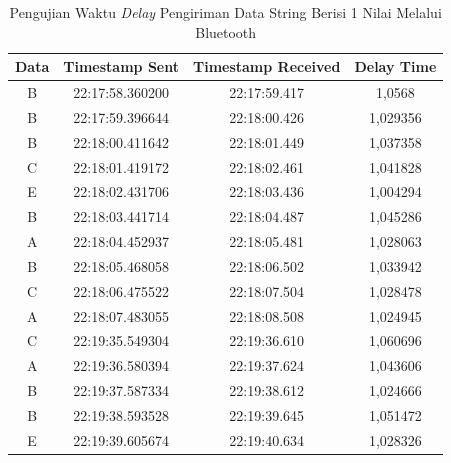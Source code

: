 \begin{longtable}{|ccc|c|}
  \caption{Pengujian Waktu \emph{Delay} Pengiriman Data String Berisi 1 Nilai Melalui Bluetooth}
  \label{tbl:delayBluetooth1}\\
  \hline
  \multicolumn{1}{|c|}{Data} & \multicolumn{1}{c|}{Timestamp Sent}  & Timestamp Received & Delay Time  \\ \hline
  \endfirsthead
  \endhead
  \multicolumn{1}{|c|}{B}    & \multicolumn{1}{c|}{22:17:58.360200} & 22:17:59.417       & 1,0568      \\ \hline
  \multicolumn{1}{|c|}{B}    & \multicolumn{1}{c|}{22:17:59.396644} & 22:18:00.426       & 1,029356    \\ \hline
  \multicolumn{1}{|c|}{B}    & \multicolumn{1}{c|}{22:18:00.411642} & 22:18:01.449       & 1,037358    \\ \hline
  \multicolumn{1}{|c|}{C}    & \multicolumn{1}{c|}{22:18:01.419172} & 22:18:02.461       & 1,041828    \\ \hline
  \multicolumn{1}{|c|}{E}    & \multicolumn{1}{c|}{22:18:02.431706} & 22:18:03.436       & 1,004294    \\ \hline
  \multicolumn{1}{|c|}{B}    & \multicolumn{1}{c|}{22:18:03.441714} & 22:18:04.487       & 1,045286    \\ \hline
  \multicolumn{1}{|c|}{A}    & \multicolumn{1}{c|}{22:18:04.452937} & 22:18:05.481       & 1,028063    \\ \hline
  \multicolumn{1}{|c|}{B}    & \multicolumn{1}{c|}{22:18:05.468058} & 22:18:06.502       & 1,033942    \\ \hline
  \multicolumn{1}{|c|}{C}    & \multicolumn{1}{c|}{22:18:06.475522} & 22:18:07.504       & 1,028478    \\ \hline
  \multicolumn{1}{|c|}{A}    & \multicolumn{1}{c|}{22:18:07.483055} & 22:18:08.508       & 1,024945    \\ \hline
  \multicolumn{1}{|c|}{C}    & \multicolumn{1}{c|}{22:19:35.549304} & 22:19:36.610       & 1,060696    \\ \hline
  \multicolumn{1}{|c|}{A}    & \multicolumn{1}{c|}{22:19:36.580394} & 22:19:37.624       & 1,043606    \\ \hline
  \multicolumn{1}{|c|}{B}    & \multicolumn{1}{c|}{22:19:37.587334} & 22:19:38.612       & 1,024666    \\ \hline
  \multicolumn{1}{|c|}{B}    & \multicolumn{1}{c|}{22:19:38.593528} & 22:19:39.645       & 1,051472    \\ \hline
  \multicolumn{1}{|c|}{E}    & \multicolumn{1}{c|}{22:19:39.605674} & 22:19:40.634       & 1,028326    \\ \hline

\end{longtable}
